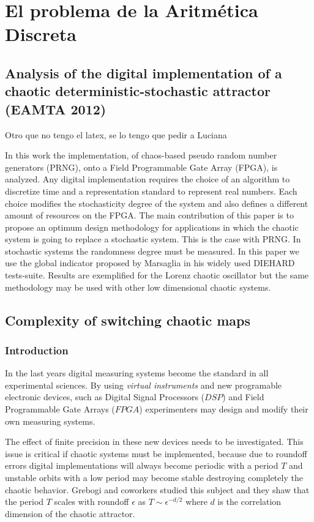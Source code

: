 \chapter{El problema de la Aritmética Discreta}

\section{Analysis of the digital implementation of a chaotic deterministic-stochastic attractor (EAMTA 2012)}

Otro que no tengo el latex, se lo tengo que pedir a Luciana


In this work the implementation, of chaos-based
pseudo random number generators (PRNG), onto a Field Programmable Gate Array (FPGA), is analyzed. Any digital implementation requires the choice of an algorithm to discretize
time and a representation standard to represent real numbers.
Each choice modifies the stochasticity degree of the system and
also defines a different amount of resources on the FPGA. The
main contribution of this paper is to propose an optimum design
methodology for applications in which the chaotic system is going
to replace a stochastic system. This is the case with PRNG. In
stochastic systems the randomness degree must be measured. In
this paper we use the global indicator proposed by Marsaglia
in his widely used DIEHARD tests-suite. Results are exemplified
for the Lorenz chaotic oscillator but the same methodology may
be used with other low dimensional chaotic systems.

\section{Complexity of switching chaotic maps}

\subsection{Introduction}
In the last years digital measuring systems become the standard in
all experimental sciences. By using \emph{virtual instruments} and new programable electronic
devices, such as Digital Signal Processors ($DSP$) and Field
Programmable Gate Arrays ($FPGA$)  experimenters may design and
modify their own measuring systems.

The effect of finite precision in these new devices needs to be
investigated. This issue is critical if  chaotic systems must be implemented, because due to roundoff errors digital implementations will always become periodic with a period $T$ and unstable orbits with a low period may become stable destroying completely the chaotic behavior.  
Grebogi and coworkers \cite{Grebogi1988} studied this subject and they shaw that the period $T$ scales with roundoff $\epsilon$ as
$T\sim\epsilon^{-d/2}$ where $d$ is the correlation dimension of
the chaotic attractor. 

